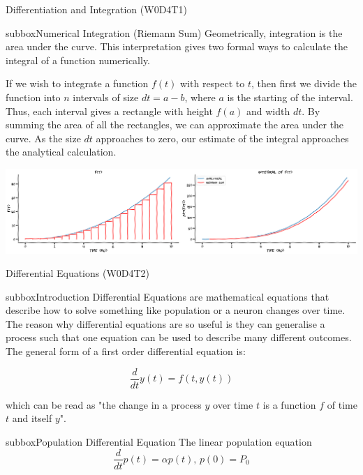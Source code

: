 \begin{multicols}{3}
\begin{textbox}{Differentiation and Integration (W0D4T1) }
\begin{subbox}{subbox}{Numerical Integration (Riemann Sum)}
Geometrically, integration is the area under the curve. This interpretation gives two formal ways to calculate the integral of a function numerically. 

If we wish to integrate a function $f(t)$ with respect to $t$, then first we divide the function into $n$ intervals of size $dt = a-b$, where $a$ is the starting of the interval. Thus, each interval gives a rectangle with height $f(a)$ and width $dt$. By summing the area of all the rectangles, we can approximate the area under the curve. As the size $dt$ approaches to zero, our estimate of the integral approaches the analytical calculation. 

\centering
\includegraphics[scale=0.12]{Figures/PreCourse/CFigure4.png}
\end{subbox}


\end{textbox}
\begin{textbox}{Differential Equations (W0D4T2) }
\begin{subbox}{subbox}{Introduction}
\scriptsize
Differential Equations are mathematical equations that describe how to solve something like population or a neuron changes over time. The reason why differential equations are so useful is they can generalise a process such that one equation can be used to describe many different outcomes.
The general form of a first order differential equation is:

\begin{equation}
\frac{d}{dt}y(t) = f\left( t,y(t) \right)
\end{equation}

which can be read as "the change in a process $y$ over time $t$ is a function $f$ of time $t$ and itself $y$".

\end{subbox}
\begin{subbox}{subbox}{Population Differential Equation}
\scriptsize
The linear population equation 
\begin{equation}
\frac{d}{dt}p(t) = \alpha p(t), \, p(0)=P_0
\end{equation}


\end{subbox}
\end{textbox}
\end{multicols}
